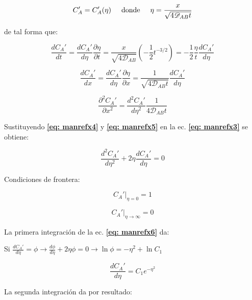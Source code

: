 \begin{equation}
	C_A' = C_A'(\eta) \hspace{0.5cm} \text{donde} \hspace{0.5cm} \eta = \frac{x}{\sqrt{4 \mathscr{D}_{AB} t}}
\end{equation}

de tal forma que:

\begin{equation} \label{eq: manrefx4}
	\frac{d C_A'}{dt} = \frac{d C_A'}{d \eta} \frac{\partial \eta}{\partial t} = \frac{x}{\sqrt{4 \mathscr{D}_{AB}}} \left( - \frac{1}{2} t^{-3/2}  \right) = - \frac{1}{2} \frac{\eta}{t} \frac{d C_A'}{d \eta}
\end{equation}

$$\frac{dC_A'}{dx} = \frac{dC_A'}{d \eta} \frac{\partial \eta}{\partial x} = \frac{1}{\sqrt{4 \mathscr{D}_{AB} t}} \frac{dC_A'}{d \eta}$$

\begin{equation} \label{eq: manrefx5}
	\frac{\partial^2 C_A'}{\partial x^2} =  \frac{d^2 C_A'}{d \eta^2} \frac{1}{4 \mathscr{D}_{AB}t}
\end{equation}

Sustituyendo \textbf{\eqref{eq: manrefx4}} y \textbf{\eqref{eq: manrefx5}} en la ec. \textbf{\eqref{eq: manrefx3}} se obtiene: 

\begin{equation} \label{eq: manrefx6}
	\frac{d^2 C_A'}{d \eta^2} + 2\eta \frac{d C_A'}{d \eta} = 0
\end{equation}

Condiciones de frontera:

\begin{equation} \label{eq: manrefx7}
	C_A'|_{\eta = 0} = 1
\end{equation}

\begin{equation} \label{eq: manrefx8}
	C_A'|_{\eta \to \infty} = 0
\end{equation}

La primera integración de la ec. \textbf{\eqref{eq: manrefx6}} da:

Si $\frac{d C_A'}{d \eta} = \phi \to \frac{d\phi}{d \eta} + 2 \eta \phi = 0 \to \ln{\phi} = -\eta^2 + \ln{C_1}$

\begin{equation} \label{eq: manrefx8.1}
	\frac{dC_A'}{d \eta} = C_1 e^{-\eta^2}
\end{equation}

La segunda integración da por resultado:


